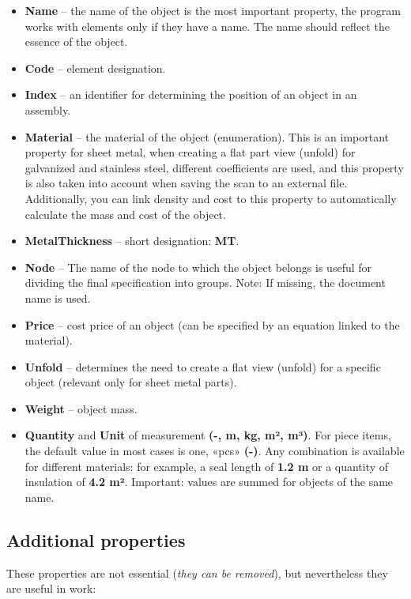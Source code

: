 \documentclass[a4paper,12pt]{article}
\begin{document}
\begin{itemize}
	\item \textbf{Name} -- the name of the object is the most important property, the program works with elements only if they have a name. The name should reflect the essence of the object.
	\item \textbf{Code} -- element designation.
	\item \textbf{Index} -- an identifier for determining the position of an object in an assembly.
	\item \textbf{Material} -- the material of the object (enumeration). This is an important property for sheet metal, when creating a flat part view (unfold) for galvanized and stainless steel, different coefficients are used, and this property is also taken into account when saving the scan to an external file. Additionally, you can link density and cost to this property to automatically calculate the mass and cost of the object.
	\item \textbf{MetalThickness} -- short designation: \textbf{MT}.
	\item \textbf{Node} -- The name of the node to which the object belongs is useful for dividing the final specification into groups. Note: If missing, the document name is used.
	\item \textbf{Price} -- cost price of an object (can be specified by an equation linked to the material).
	\item \textbf{Unfold} -- determines the need to create a flat view (unfold) for a specific object (relevant only for sheet metal parts).
	\item \textbf{Weight} -- object mass.
	\item \textbf{Quantity} and \textbf{Unit} of measurement \textbf{(-, m, kg, m², m³)}. For piece items, the default value in most cases is one, «pcs» \textbf{(-)}. Any combination is available for different materials: for example, a seal length of \textbf{1.2 m} or a quantity of insulation of \textbf{4.2 m²}. Important: values ​​are summed for objects of the same name.
\end{itemize}


\subsection{Additional properties}

These properties are not essential (\emph{they can be removed}), but nevertheless they are useful in work:
\end{document}
